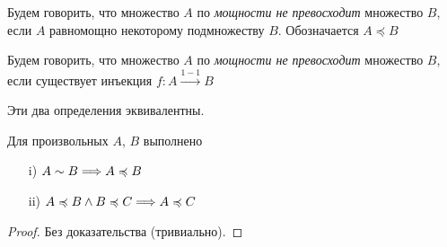 \begin{definition}
    Будем говорить, что множество $A$ по \textit{мощности не превосходит}
    множество $B$, если $A$ равномощно некоторому подмножеству $B$.
    Обозначается $A \preccurlyeq B$
\end{definition}

\begin{definition}
    Будем говорить, что множество $A$ по \textit{мощности не превосходит}
    множество $B$, если существует инъекция $f \colon A \xrightarrow{1-1} B$
\end{definition}

\begin{remark}
    Эти два определения эквивалентны.
\end{remark}

\begin{theorem}
    Для произвольных $A$, $B$ выполнено
    \begin{itemize}
        \item[i)] $A \sim B \Longrightarrow A \preccurlyeq B$
        \item[ii)] $A \preccurlyeq B \wedge B \preccurlyeq C \Longrightarrow A \preccurlyeq
        C$
    \end{itemize}
\end{theorem}
\begin{proof}
    Без доказательства (тривиально).
\end{proof}

